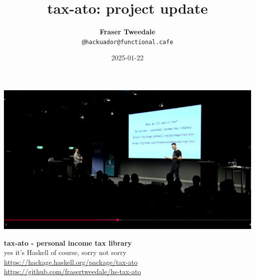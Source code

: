 \documentclass[ignorenonframetext,aspectratio=169,12pt]{beamer}
\title{\bf tax-ato: project update}
\author{{\bf Fraser Tweedale}\\
    \texttt{@hackuador@functional.cafe}}
\date{2025-01-22}
\begin{document}
\frame{\titlepage}

\begin{frame}[plain]
    \includegraphics[height=\paperheight,width=\paperwidth]{screenshot.png}
\end{frame}


\begin{frame}[plain]
\Large
\center
\ttfamily
\textbf{ tax-ato - personal income tax library}\\
\bigskip
yes it's Haskell of course, sorry not sorry\\
\bigskip
\url{https://hackage.haskell.org/package/tax-ato}\\
\bigskip
\url{https://github.com/frasertweedale/hs-tax-ato}

\end{frame}
\end{document}
